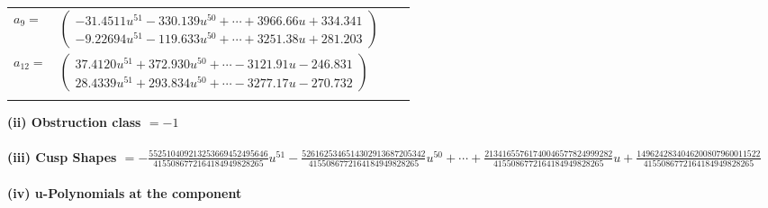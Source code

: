 \documentclass[1p]{elsarticle_modified}
\theoremstyle{definition}
\begin{document}
\begin{tabular}{m{7pt} m{180pt} m{7pt} m{180pt} }
\flushright $a_{9}=$&$\begin{pmatrix}-31.4511 u^{51}-330.139 u^{50}+\cdots+3966.66 u+334.341\\-9.22694 u^{51}-119.633 u^{50}+\cdots+3251.38 u+281.203\end{pmatrix}$ \\
\flushright $a_{12}=$&$\begin{pmatrix}37.4120 u^{51}+372.930 u^{50}+\cdots-3121.91 u-246.831\\28.4339 u^{51}+293.834 u^{50}+\cdots-3277.17 u-270.732\end{pmatrix}$\\&\end{tabular}
\flushleft \textbf{(ii) Obstruction class $= -1$}\\~\\
\flushleft \textbf{(iii) Cusp Shapes $= -\frac{552510409213253669452495646}{4155086772164184949828265} u^{51}-\frac{5261625346514302913687205342}{4155086772164184949828265} u^{50}+\cdots+\frac{21341655761740046577824999282}{4155086772164184949828265} u+\frac{1496242834046200807960011522}{4155086772164184949828265}$}\\~\\
\newpage\renewcommand{\arraystretch}{1}
\flushleft \textbf{(iv) u-Polynomials at the component}\newline \\
\end{document}
